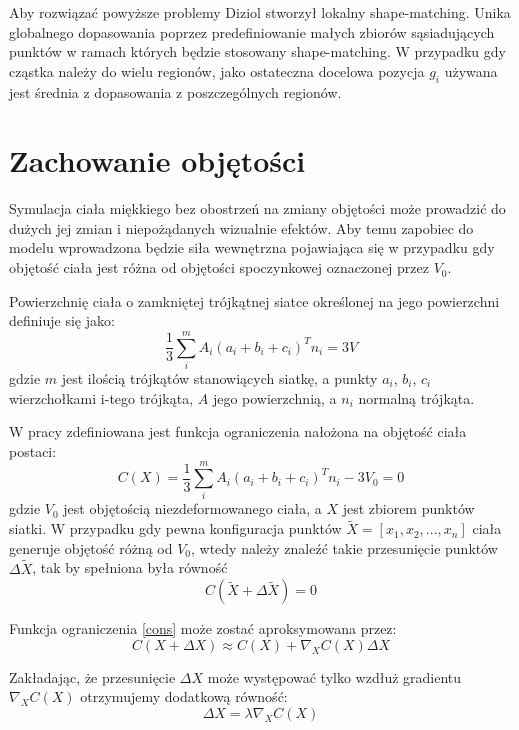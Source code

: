 Aby rozwiązać powyższe problemy Diziol \cite{diziol} stworzył lokalny
shape-matching.  Unika globalnego dopasowania poprzez predefiniowanie małych
zbiorów sąsiadujących punktów w ramach których będzie stosowany shape-matching.
W przypadku gdy cząstka należy do wielu regionów, jako ostateczna docelowa
pozycja $g_i$ używana jest średnia z dopasowania z poszczególnych regionów.

\section{Zachowanie objętości}
Symulacja ciała miękkiego bez obostrzeń na zmiany objętości może
prowadzić do dużych jej zmian i niepożądanych wizualnie efektów. 
Aby temu zapobiec do modelu wprowadzona będzie siła wewnętrzna pojawiająca się w
przypadku gdy objętość ciała jest różna od objętości spoczynkowej oznaczonej
przez $V_0$.

Powierzchnię ciała o zamkniętej trójkątnej siatce określonej na jego powierzchni definiuje
się jako: \cite{diziol}
\begin{equation}
\label{obj}
\frac{1}{3} \sum_i^m A_i (a_i + b_i + c_i)^T n_i = 3V
\end{equation}
gdzie $m$ jest ilością trójkątów stanowiących siatkę, a punkty $a_i$, $b_i$,
	  $c_i$ wierzchołkami i-tego trójkąta, $A$ jego powierzchnią, a $n_i$
	  normalną trójkąta.

W pracy \cite{diziol} zdefiniowana jest funkcja ograniczenia nałożona na
objętość ciała postaci:
\begin{equation}
\label{cons}
C(X) = \frac{1}{3} \sum_i^m A_i (a_i + b_i + c_i)^T n_i - 3V_0 = 0
\end{equation}
gdzie $V_0$ jest objętością niezdeformowanego ciała, a $X$ jest zbiorem punktów
siatki. W przypadku gdy pewna konfiguracja punktów $\tilde{X} = [x_1, x_2,...,
	x_n] $ ciała generuje
objętość różną od $V_0$, wtedy należy znaleźć takie przesunięcie punktów $\Delta
\tilde{X}$, tak by spełniona była równość 
$$C(\tilde{X} + \Delta \tilde{X}) = 0$$

Funkcja ograniczenia \ref{cons} może zostać aproksymowana przez:
\begin{equation}
\label{e1}
C(X + \Delta X) \approx C(X) + \nabla_X C(X) \Delta X
\end{equation}

Zakładając, że przesunięcie $\Delta X$ może występować tylko wzdłuż gradientu $\nabla_X
C(X)$ otrzymujemy dodatkową równość:
\begin{equation}
\label{e2}
\Delta X = \lambda \nabla_X C(X)
\end{equation}

